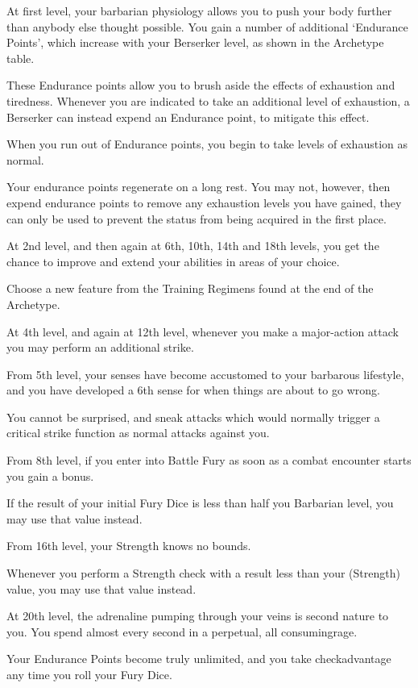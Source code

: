 {
At first level, your barbarian physiology allows you to push your body further than anybody else thought possible. You gain a number of additional `Endurance Points', which increase with your Berserker level, as shown in the Archetype table. 

These Endurance points allow you to brush aside the effects of exhaustion and tiredness. Whenever you are indicated to take an additional level of exhaustion, a Berserker can instead expend an Endurance point, to mitigate this effect. 

When you run out of Endurance points, you begin to take levels of exhaustion as normal. 

Your endurance points regenerate on a long rest. You may not, however, then expend endurance points to remove any exhaustion levels you have gained, they can only be used to prevent the status from being acquired in the first place.
}

{
At 2nd level, and then again at 6th, 10th, 14th and 18th levels, you get the chance to improve and extend your abilities in areas of your choice. 

Choose a new feature from the Training Regimens found at the end of the Archetype. 
}

{
	At 4th level, and again at 12th level, whenever you make a major-action attack you may perform an additional strike. 
}

{
	From 5th level, your senses have become accustomed to your barbarous lifestyle, and you have developed a 6th sense for when things are about to go wrong. 

	You cannot be surprised, and sneak attacks which would normally trigger a critical strike function as normal attacks against you. 
}

{
	From 8th level, if you enter into Battle Fury as soon as a combat encounter starts you gain a bonus. 
	
	If the result of your initial Fury Dice is less than half you Barbarian level, you may use that value instead. 
}

{
	From 16th level, your Strength knows no bounds. 
	
	Whenever you perform a Strength check with a result less than your \attPhys{} (Strength) value, you may use that value instead. 
}

{
	At 20th level, the adrenaline pumping through your veins is second nature to you. You spend almost every second in a perpetual, all consuming\minus{}rage. 
	
	Your Endurance Points become truly unlimited, and you take check\minus{}advantage any time you roll your Fury Dice. 
}

